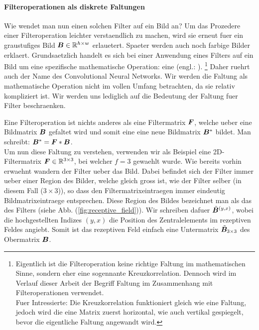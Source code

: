 \documentclass[../main]{subfiles}
\begin{document}
\para{}
\cite{Markl}

\paragraph{Filteroperationen als diskrete Faltungen}
Wie wendet man nun einen solchen Filter auf ein Bild an? Um das Prozedere einer
Filteroperation leichter verstaendlich zu machen, wird sie erneut fuer ein
graustufiges Bild $\bm{B} \in \mathbb{R}^{h \times w}$ erlauetert. Spaeter werden auch noch farbige
Bilder erklaert.
\para{}
Grundsaetzlich handelt es sich bei einer Anwendung eines Filters auf ein Bild um
eine spezifische mathematische Operation: eine  (engl.:
).
\footnote{
  Eigentlich ist die Filteroperation keine richtige Faltung im mathematischen
  Sinne, sondern eher eine sogennante Kreuzkorrelation. Dennoch wird im Verlauf
  dieser Arbeit der Begriff Faltung im Zusammenhang mit Filteroperationen verwendet.\\
  Fuer Intressierte: Die Kreuzkorrelation funktioniert gleich wie eine Faltung,
  jedoch wird die eine Matrix zuerst horizontal, wie auch vertikal gespiegelt,
  bevor die eigentliche Faltung angewandt wird.
}
Daher ruehrt auch der Name des Convolutional Neural Networks.
Wir werden die Faltung als mathematische Operation nicht im vollen Umfang
betrachten, da sie relativ kompliziert ist. Wir werden uns lediglich auf die
Bedeutung der Faltung fuer Filter beschraenken.
\para{}

Eine Filteroperation ist nichts anderes als eine Filtermatrix $\bm{F}$, welche ueber eine
Bildmatrix $\bm{B}$ gefaltet wird und somit eine eine neue Bildmatrix
$\bm{B}^*$ bildet. Man schreibt: $\bm{B}^* = \bm{F} * \bm{B}$.\\
Um nun diese Faltung zu verstehen, verwenden wir als Beispiel eine
2D-Filtermatrix $\bm{F} \in \mathbb{R}^{3 \times 3}$, bei welcher
$f = 3$ gewaehlt wurde.
Wie bereits vorhin erwaehnt wandern der Filter ueber das Bild. Dabei befindet
sich der Filter immer ueber einer Region des Bilder, welche gleich gross ist,
wie der Filter selber (in diesem Fall ($3 \times 3$)), so dass den Filtermatrixeintraegen immer eindeutig
Bildmatrixeintraege entsprechen. Diese Region des Bildes bezeichnet man als das
 des Filters (siehe Abb. (\ref{fig:receptive_field})). Wir schreiben dafuer
$\tilde{\bm{B}}^{(y,x)}$, wobei die hochgestellten Indizes $(y,x)$ die Position
des Zentralelements im rezeptiven Feldes angiebt. Somit ist das rezeptiven Feld einfach eine
Untermatrix $\tilde{\bm{B}}_{3 \times 3}$ des Obermatrix $\bm{B}$.
\end{document}
